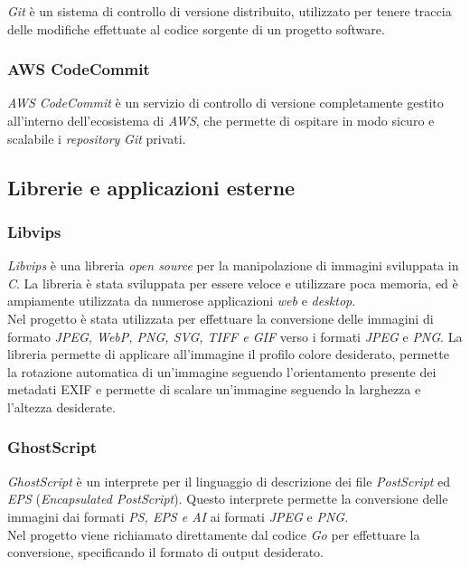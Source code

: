 \emph{Git} è un sistema di controllo di versione distribuito, utilizzato per
tenere traccia delle modifiche effettuate al codice sorgente di un progetto
\glsfirstoccur\gls{software}.

\subsubsection*{AWS CodeCommit}

\emph{AWS CodeCommit} è un servizio di controllo di versione completamente
gestito all'interno dell'ecosistema di \emph{AWS}, che permette di ospitare in modo sicuro e scalabile i \emph{repository}
\emph{Git} privati. \\

\subsection{Librerie e applicazioni esterne}

\subsubsection*{Libvips}

\emph{Libvips} è una libreria \emph{open source} per la manipolazione di immagini
sviluppata in \emph{C}. La libreria è stata sviluppata per essere veloce e
utilizzare poca memoria, ed è ampiamente utilizzata da numerose applicazioni
\emph{web} e \emph{desktop}. \\
Nel progetto è stata utilizzata per effettuare la conversione delle immagini
di formato \emph{JPEG, WebP, PNG, SVG, TIFF e GIF} verso i formati \emph{JPEG} e
\emph{PNG}. La libreria permette di applicare all'immagine il profilo colore
desiderato, permette la rotazione automatica di un'immagine seguendo
l'orientamento presente dei \glsfirstoccur\gls{metadati}
\glsfirstoccur\gls{EXIF} e permette di scalare un'immagine seguendo la larghezza
e l'altezza desiderate. \cite{libvips}

\subsubsection*{GhostScript}

\emph{GhostScript} è un interprete per il linguaggio di descrizione dei file
\emph{PostScript} ed \emph{EPS} (\emph{Encapsulated PostScript}).
Questo interprete permette la conversione delle immagini dai formati \emph{PS,
      EPS e AI} ai formati \emph{JPEG} e
\emph{PNG}. \\
Nel progetto viene richiamato direttamente dal codice \emph{Go} per effettuare
la conversione, specificando il formato di output desiderato. \cite{ghostscript}

